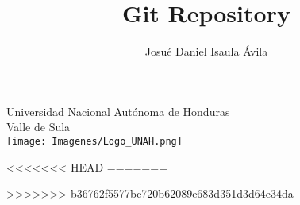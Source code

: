 \documentclass[12pt,a4paper]{article}
\author{Josué Daniel Isaula Ávila}
\title{Git Repository}
\begin{document}
\maketitle 

\begin{center}
    \huge Universidad Nacional Autónoma de Honduras \\ 
    \large Valle de Sula \\
    \vspace{5 mm}
    \texttt{[image: Imagenes/Logo\_UNAH.png]}
\end{center}
\newpage
<<<<<<< HEAD
=======

>>>>>>> b36762f5577be720b62089e683d351d3d64e34da
\end{document}
